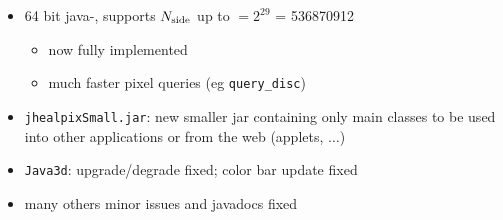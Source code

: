 \documentclass[12pt,twoside]{article}
\newcommand{\nside}{{N_{\rm side}}}
\begin{document}
{{%
\begin{itemize}
	\setlength{\itemsep}{0pt}
	\setlength{\parsep}{0pt}
	\item 64 bit java-\healpix, supports $\nside$ up to $ = 2^{29}$ = 536870912
	\begin{itemize}
	\setlength{\itemsep}{0pt}
	\setlength{\parsep}{0pt}
		\item now fully implemented
		\item much faster pixel queries (eg {\tt query\_disc})
	\end{itemize}
	\item {\tt jhealpixSmall.jar}: new smaller jar containing only main
classes to be used into other applications or from the web (applets, $\ldots$)
	\item {\tt Java3d}: upgrade/degrade fixed; color bar update fixed
	\item many others minor issues and javadocs fixed
\end{itemize}
}}
\end{document}
